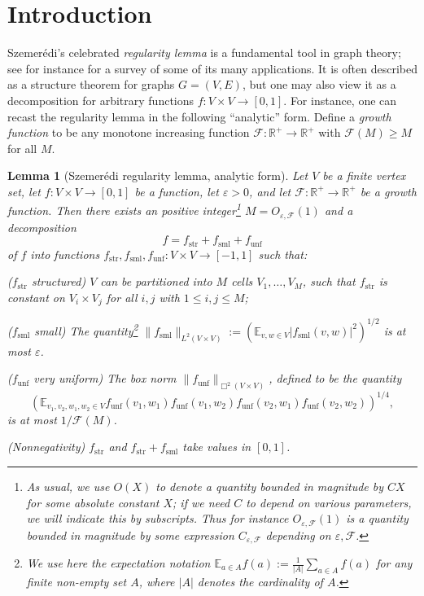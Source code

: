 \documentclass[11pt,reqno]{amsart}
\numberwithin{equation}{section}
\theoremstyle{plain}
\newtheorem{lemma}[subsection]{Lemma}
\theoremstyle{definition}
\renewcommand{\leq}{\leqslant}
\renewcommand{\geq}{\geqslant}
\newcommand\E{{\mathbb{E}}}
\newcommand\R{\mathbb{R}}
\newcommand\1{{\bf 1}}
\newcommand\2{{\bf 2}}
\newcommand\eps{\varepsilon}
\newcommand\str{{\operatorname{str}}}
\newcommand\sml{{\operatorname{sml}}}
\newcommand\unf{{\operatorname{unf}}}
\newcommand\Grow{{\mathcal F}}
\begin{document}
\setcounter{tocdepth}{1}

\section{Introduction}

Szemer\'edi's celebrated \emph{regularity lemma} \cite{szemeredi-aps, szemeredi-reg} is a fundamental tool in graph theory; see for instance \cite{komlos} for a survey of some of its many applications.  It is often described as a structure theorem for graphs $G = (V,E)$, but one may also view it as a decomposition for arbitrary functions $f: V \times V \to [0,1]$. For instance, one can recast the regularity lemma in the following ``analytic'' form.  Define a \emph{growth function} to be any monotone increasing function $\Grow: \R^+ \to \R^+$ with $\Grow(M) \geq M$ for all $M$.

\begin{lemma}[Szemer\'edi regularity lemma, analytic form]\label{szrl}  Let $V$ be a finite vertex set, let $f: V \times V \to [0,1]$ be a function, let $\eps > 0$, and let $\Grow: \R^+ \to \R^+$ be a growth function.  Then there exists an positive integer\footnote{As usual, we use $O(X)$ to denote a quantity bounded in magnitude by $CX$ for some absolute constant $X$; if we need $C$ to depend on various parameters, we will indicate this by subscripts.  Thus for instance $O_{\eps,\Grow}(1)$ is a quantity bounded in magnitude by some expression $C_{\eps,\Grow}$ depending on $\eps,\Grow$.} $M = O_{\eps,\Grow}(1)$ and a decomposition
\begin{equation}\label{fss}
 f = f_\str + f_\sml + f_\unf
\end{equation}
of $f$ into functions $f_\str, f_\sml, f_\unf: V \times V \to [-1,1]$ such that:

\textup{(}$f_\str$ structured\textup{)} $V$ can be partitioned into $M$ cells $V_1,\ldots,V_M$, such that $f_\str$ is constant on $V_i \times V_j$ for all $i,j$ with $1 \leq i,j \leq M$;

\textup{(}$f_\sml$ small\textup{)} The quantity\footnote{We use here the expectation notation $\E_{a \in A} f(a) := \frac{1}{|A|} \sum_{a \in A} f(a)$ for any finite non-empty set $A$, where $|A|$ denotes the cardinality of $A$.} $\|f_\sml\|_{L^2(V \times V)} := (\E_{v,w \in V} |f_\sml(v,w)|^2)^{1/2}$ is at most $\eps$.

\textup{(}$f_\unf$ very uniform\textup{)}  The box norm  $\| f_\unf\|_{\Box^2(V \times V)} $, defined to be the quantity
$$ (\E_{v_1,v_2,w_1,w_2 \in V} f_\unf(v_1,w_1) f_\unf(v_1,w_2) f_\unf(v_2,w_1) f_\unf(v_2,w_2))^{1/4},$$
is at most $1/\Grow(M)$.

\textup{(}Nonnegativity\textup{)} $f_{\str}$ and $f_\str + f_\sml$ take values in $[0,1]$.
\end{lemma}
\end{document}
